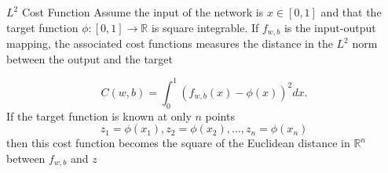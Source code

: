 \documentclass{beamer}
\begin{document}
\begin{frame}{$L^2$ Cost Function}
	Assume the input of the network is $x\in [0,1]$ and that the target function $\phi\colon [0,1] \to \mathbb{R}$ is square integrable. If $f_{w,b}$ is the input-output mapping, the associated cost functions measures the distance in the $L^2$ norm between the output and the target
	
	\begin{equation*}
		C(w,b)= \int_{0}^{1} (f_{w,b}(x)-\phi(x))^2 dx.
	\end{equation*}
	If the target function is known at only $n$ points
		\begin{equation*}
		z_1=\phi(x_1), z_2=\phi(x_2), \ldots, z_n= \phi(x_n)
	\end{equation*}
	then this cost function becomes the square of the Euclidean distance in $\mathbb{R}^n$ between $f_{w,b}$ and $z$
	
\end{frame}
\end{document}
